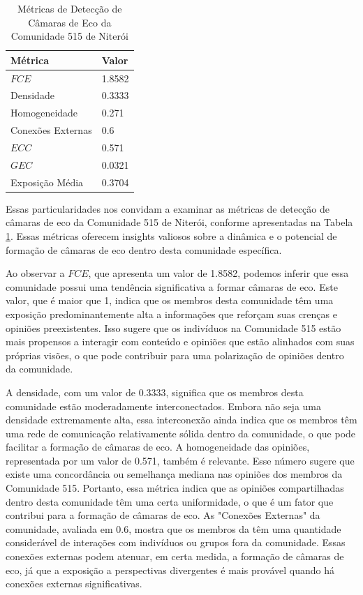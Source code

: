 \begin{table}[ht]
	\centering
	\caption{Métricas de Detecção de Câmaras de Eco da Comunidade 515 de Niterói}
	\label{tab:echo-chamber-metrics-community515}
	\begin{tabular}{l|l}
		\toprule
		\textbf{Métrica}  & \textbf{Valor} \\
		\midrule
		$FCE$             & 1.8582         \\
		Densidade         & 0.3333         \\
		Homogeneidade     & 0.271          \\
		Conexões Externas & 0.6            \\
		$ECC$             & 0.571          \\
		$GEC$             & 0.0321         \\
		Exposição Média   & 0.3704         \\
		\bottomrule
	\end{tabular}
\end{table}

Essas particularidades nos convidam a examinar as métricas de detecção de câmaras de eco da Comunidade 515 de Niterói, conforme apresentadas na Tabela \ref{tab:echo-chamber-metrics-community515}. Essas métricas oferecem insights valiosos sobre a dinâmica e o potencial de formação de câmaras de eco dentro desta comunidade específica.

Ao observar a $FCE$, que apresenta um valor de 1.8582, podemos inferir que essa comunidade possui uma tendência significativa a formar câmaras de eco. Este valor, que é maior que 1, indica que os membros desta comunidade têm uma exposição predominantemente alta a informações que reforçam suas crenças e opiniões preexistentes. Isso sugere que os indivíduos na Comunidade 515 estão mais propensos a interagir com conteúdo e opiniões que estão alinhados com suas próprias visões, o que pode contribuir para uma polarização de opiniões dentro da comunidade.

A densidade, com um valor de 0.3333, significa que os membros desta comunidade estão moderadamente interconectados. Embora não seja uma densidade extremamente alta, essa interconexão ainda indica que os membros têm uma rede de comunicação relativamente sólida dentro da comunidade, o que pode facilitar a formação de câmaras de eco. A homogeneidade das opiniões, representada por um valor de 0.571, também é relevante. Esse número sugere que existe uma concordância ou semelhança mediana nas opiniões dos membros da Comunidade 515. Portanto, essa métrica indica que as opiniões compartilhadas dentro desta comunidade têm uma certa uniformidade, o que é um fator que contribui para a formação de câmaras de eco. As "Conexões Externas" da comunidade, avaliada em 0.6, mostra que os membros da têm uma quantidade considerável de interações com indivíduos ou grupos fora da comunidade. Essas conexões externas podem atenuar, em certa medida, a formação de câmaras de eco, já que a exposição a perspectivas divergentes é mais provável quando há conexões externas significativas.

